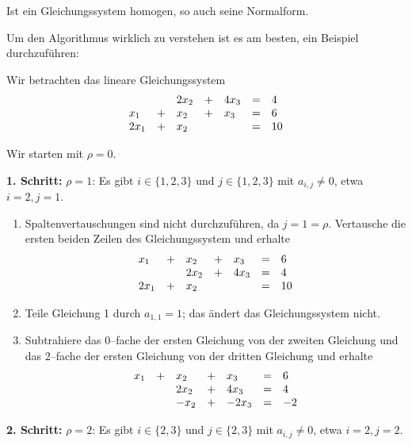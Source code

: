 \begin{korollar} Ist ein Gleichungssystem homogen, so auch seine Normalform.
\end{korollar}

\medbreak

Um den Algorithmus wirklich zu verstehen ist es am besten, ein Beispiel durchzuführen:

\begin{beispiel} Wir betrachten das lineare Gleichungssystem
  	$$ \begin{array} {l c l c l c  l}
  	& & 2 x_2 & + & 4 x_3 & = & 4 \\
  	x_1 & + & x_2 & + & x_3 & = & 6 \\
  	2 x_1 & + & x_2 &   &   & = & 10
  	\end{array} $$

Wir starten mit $\rho = 0$.

\textbf{1. Schritt:} $\rho = 1$: Es gibt $i \in \{1, 2, 3\}$ und $j \in \{1, 2, 3 \}$ mit $a_{i, j} \neq 0$, etwa 
$i = 2, j= 1$. 

\begin{enumerate} 
\item Spaltenvertauschungen sind nicht durchzuführen, da $j = 1 = \rho$. 
Vertausche die ersten beiden Zeilen des Gleichungssystem und erhalte
  	$$ \begin{array} {l c l c l c  l}
  	x_1 & + & x_2 & + & x_3 & = & 6 \\
  	& & 2 x_2 & + & 4 x_3 & = & 4 \\
  	2 x_1 & + & x_2 &   &   & = & 10
  	\end{array} $$
\item Teile Gleichung 1 durch $a_{1,1} = 1$; das ändert das Gleichungssystem nicht.
\item Subtrahiere das $0$--fache der ersten Gleichung von der zweiten Gleichung und das $2$--fache der 
ersten Gleichung von der dritten Gleichung und erhalte
  	$$ \begin{array} {l c l c l c  l}
  	x_1 & + & x_2 & + & x_3 & = & 6 \\
  	& & 2 x_2 & + & 4 x_3 & = & 4 \\
  	&  & - x_2 & + & - 2 x_3 & = & -2
  	\end{array} $$
\end{enumerate}

\textbf{2. Schritt:} $\rho = 2$: Es gibt $i \in \{2, 3\}$ und $j \in \{ 2, 3 \}$ mit $a_{i, j} \neq 0$, etwa 
$i = 2, j= 2$. 


\end{beispiel}
